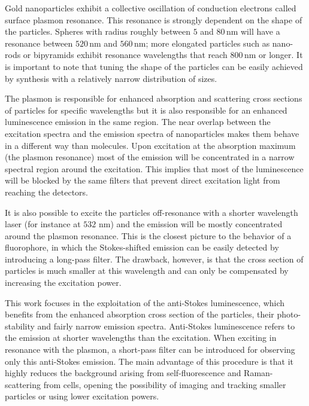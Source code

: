 \documentclass[journal=nalefd,manuscript=letter]{achemso}
\newcommand{\nm}{\ensuremath{\,\textrm{nm}}}
\begin{document}
Gold nanoparticles exhibit a collective oscillation of conduction electrons
called surface plasmon resonance\cite{Bouhelier2005}. This resonance is strongly
dependent on the shape of the particles\cite{Dulkeith2004}\cite{Link2000a}.
Spheres with radius roughly between $5$ and $80\nm$ will have a resonance
between $520\nm$ and $560\nm$; more elongated particles such as nano-rods or
bipyramids\cite{Rao2015} exhibit resonance wavelengths that reach $800\nm$ or
longer\cite{Ngoc2015}. It is important to note that tuning the shape of the
particles can be easily achieved by synthesis with a relatively narrow
distribution of sizes\cite{Nikoobakht2003}.

The plasmon is responsible for enhanced absorption and scattering cross
sections\cite{Ni2008} of particles for specific wavelengths but it is also
responsible for an enhanced luminescence emission in the same region. The near
overlap between the excitation spectra and the emission
spectra\cite{Yorulmaz2012} of nanoparticles makes them behave in a different way
than molecules. Upon excitation at the absorption maximum (the plasmon
resonance) most of the emission will be concentrated in a narrow spectral region
around the excitation. This implies that most of the luminescence will be
blocked by the same filters that prevent direct excitation light from reaching
the detectors.

It is also possible to excite the particles off-resonance with a shorter
wavelength laser (for instance at $532\,\nm$) and the emission will be mostly
concentrated around the plasmon resonance. This is the closest picture to the
behavior of a fluorophore, in which the Stokes-shifted emission can be easily
detected by introducing a long-pass filter. The drawback, however, is that the
cross section of particles is much smaller at this wavelength and can only be
compensated by increasing the excitation power.

This work focuses in the exploitation of the anti-Stokes
luminescence\cite{Jiang2013}, which benefits from the enhanced absorption cross
section of the particles, their photo-stability and fairly narrow emission
spectra. Anti-Stokes luminescence refers to the emission at shorter wavelengths
than the excitation. When exciting in resonance with the plasmon, a short-pass
filter can be introduced for observing only this anti-Stokes emission. The main
advantage of this procedure is that it highly reduces the background arising
from self-fluorescence and Raman-scattering from cells, opening the possibility
of imaging and tracking smaller particles or using lower excitation powers.
\end{document}
